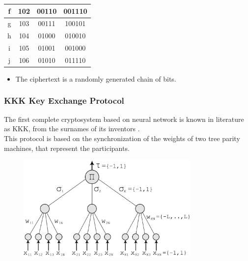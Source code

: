 \documentclass{beamer}
\begin{document}
\begin{frame}
\begin{table}[]
\begin{tabular}{|c|c|c|c|}
f             & 102                                                           & 00110                                                                        & 001110                                                                       \\ \hline
g             & 103                                                           & 00111                                                                        & 100101                                                                       \\ \hline
h             & 104                                                           & 01000                                                                        & 010010                                                                       \\ \hline
i             & 105                                                           & 01001                                                                        & 001000                                                                       \\ \hline
j             & 106                                                           & 01010                                                                        & 011110                                                                       \\ \hline

\end{tabular}
\end{table}
\begin{itemize}
\item The ciphertext is a randomly generated chain of bits.
\end{itemize}
\end{frame}
\begin{frame}
\frametitle{KKK Key Exchange Protocol}
The first complete cryptosystem based on neural network is known in literature as KKK, from the surnames of its inventors \cite{kanter}. \\
This protocol is based on the synchronization of the weights of two tree parity machines, that represent the participants.
\begin{figure}
\includegraphics[width = 0.8\textwidth]{"pictures/tpm.jpg"}
\end{figure}
\end{frame}
\end{document}

